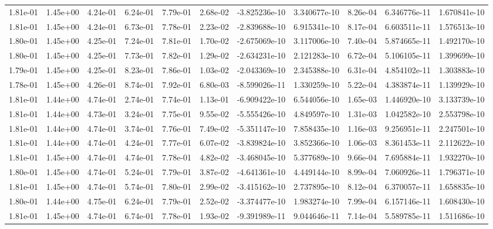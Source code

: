 \begin{longtable}{| p{} | p{} |}
1.81e-01 & 1.45e+00 & 4.24e-01 & 6.24e-01 & 7.79e-01 & 2.68e-02 & -3.825236e-10 &  3.340677e-10 &  8.26e-04 &  6.346776e-11 &  1.670841e-10 \\
1.81e-01 & 1.45e+00 & 4.24e-01 & 6.73e-01 & 7.78e-01 & 2.23e-02 & -2.839688e-10 &  6.915341e-10 &  8.17e-04 &  6.603511e-11 &  1.576513e-10 \\
1.80e-01 & 1.45e+00 & 4.25e-01 & 7.24e-01 & 7.81e-01 & 1.70e-02 & -2.675069e-10 &  3.117006e-10 &  7.40e-04 &  5.874665e-11 &  1.492170e-10 \\
1.80e-01 & 1.45e+00 & 4.25e-01 & 7.73e-01 & 7.82e-01 & 1.29e-02 & -2.634231e-10 &  2.121283e-10 &  6.72e-04 &  5.106105e-11 &  1.399699e-10 \\
1.79e-01 & 1.45e+00 & 4.25e-01 & 8.23e-01 & 7.86e-01 & 1.03e-02 & -2.043369e-10 &  2.345388e-10 &  6.31e-04 &  4.854102e-11 &  1.303883e-10 \\
1.78e-01 & 1.45e+00 & 4.26e-01 & 8.74e-01 & 7.92e-01 & 6.80e-03 & -8.599026e-11 &  1.330259e-10 &  5.22e-04 &  4.383874e-11 &  1.139929e-10 \\
1.81e-01 & 1.44e+00 & 4.74e-01 & 2.74e-01 & 7.74e-01 & 1.13e-01 & -6.909422e-10 &  6.544056e-10 &  1.65e-03 &  1.446920e-10 &  3.133739e-10 \\
1.81e-01 & 1.44e+00 & 4.73e-01 & 3.24e-01 & 7.75e-01 & 9.55e-02 & -5.555426e-10 &  4.849597e-10 &  1.31e-03 &  1.042582e-10 &  2.553798e-10 \\
1.81e-01 & 1.44e+00 & 4.74e-01 & 3.74e-01 & 7.76e-01 & 7.49e-02 & -5.351147e-10 &  7.858435e-10 &  1.16e-03 &  9.256951e-11 &  2.247501e-10 \\
1.81e-01 & 1.44e+00 & 4.74e-01 & 4.24e-01 & 7.77e-01 & 6.07e-02 & -3.839824e-10 &  3.852366e-10 &  1.06e-03 &  8.361453e-11 &  2.112622e-10 \\
1.81e-01 & 1.45e+00 & 4.74e-01 & 4.74e-01 & 7.78e-01 & 4.82e-02 & -3.468045e-10 &  5.377689e-10 &  9.66e-04 &  7.695884e-11 &  1.932270e-10 \\
1.80e-01 & 1.45e+00 & 4.74e-01 & 5.24e-01 & 7.79e-01 & 3.87e-02 & -4.641361e-10 &  4.449144e-10 &  8.99e-04 &  7.060926e-11 &  1.796371e-10 \\
1.81e-01 & 1.45e+00 & 4.74e-01 & 5.74e-01 & 7.80e-01 & 2.99e-02 & -3.415162e-10 &  2.737895e-10 &  8.12e-04 &  6.370057e-11 &  1.658835e-10 \\
1.80e-01 & 1.44e+00 & 4.75e-01 & 6.24e-01 & 7.79e-01 & 2.52e-02 & -3.374477e-10 &  1.983274e-10 &  7.99e-04 &  6.157146e-11 &  1.608430e-10 \\
1.81e-01 & 1.45e+00 & 4.74e-01 & 6.74e-01 & 7.78e-01 & 1.93e-02 & -9.391989e-11 &  9.044646e-11 &  7.14e-04 &  5.589785e-11 &  1.511686e-10 \\

\end{longtable}
